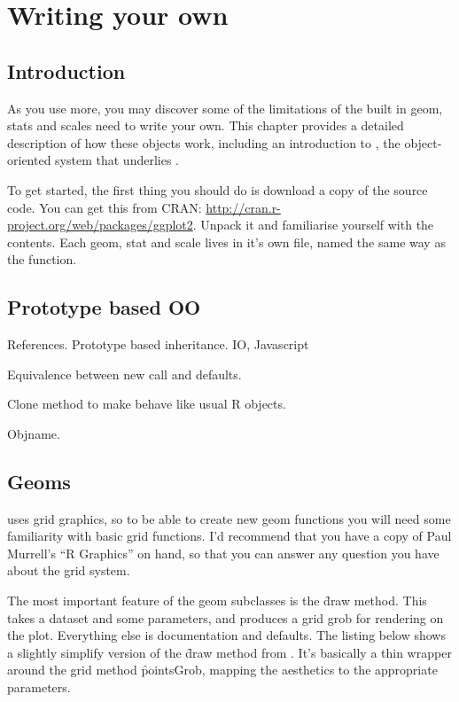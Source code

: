 

\chapter{Writing your own}

\section{Introduction}

As you use \ggplot more, you may discover some of the limitations of the built in geom, stats and scales need to write your own.  This chapter provides a detailed description of how these objects work, including an introduction to , the object-oriented system that underlies \ggplot.

To get started, the first thing you should do is download a copy of the source code.  You can get this from CRAN: \url{http://cran.r-project.org/web/packages/ggplot2}.  Unpack it and familiarise yourself with the contents.  Each geom, stat and scale lives in it's own file, named the same way as the function.  

\section{Prototype based OO} %
\label{sec:proto}

References.
Prototype based inheritance.  IO, Javascript

Equivalence between new call and defaults.

Clone method to make behave like usual R objects.

Objname.

\section{Geoms}
\label{sec:own-geom}

\ggplot uses grid graphics, so to be able to create new geom functions you will need some familiarity with basic grid functions.  I'd recommend that you have a copy of Paul Murrell's ``R Graphics'' on hand, so that you can answer any question you have about the grid system.

The most important feature of the geom subclasses is the \f{draw} method.  This takes a dataset and some parameters, and produces a grid grob for rendering on the plot.  Everything else is documentation and defaults.  The listing below shows a slightly simplify version of the \f{draw} method from .  It's basically a thin wrapper around the grid method \f{pointsGrob}, mapping the aesthetics to the appropriate parameters.

